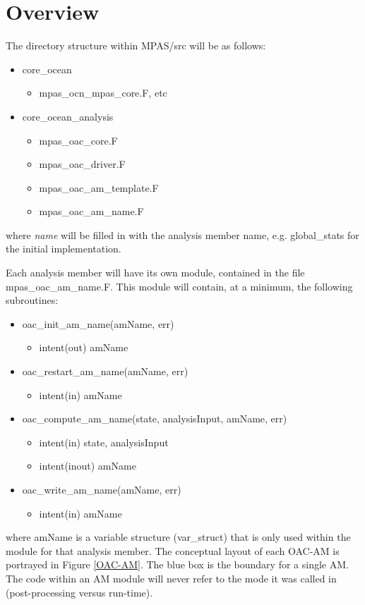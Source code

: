 \documentclass[11pt]{report}
\begin{document}
\section{Overview}

The directory structure within MPAS/src will be as follows:
\begin{itemize}
\item core\_ocean
\begin{itemize}
\item mpas\_ocn\_mpas\_core.F, etc
\end{itemize}
\item core\_ocean\_analysis
\begin{itemize}
\item mpas\_oac\_core.F
\item mpas\_oac\_driver.F
\item mpas\_oac\_am\_template.F
\item mpas\_oac\_am\_name.F
\end{itemize}
\end{itemize}
where {\it name} will be filled in with the analysis member name, e.g. global\_stats for the initial implementation.

Each analysis member will have its own module, contained in the file mpas\_oac\_am\_name.F.  This module will contain, at a minimum, the following subroutines:
\begin{itemize}
\item oac\_init\_am\_name(amName, err)
\begin{itemize}
\item intent(out) amName
\end{itemize}
\item oac\_restart\_am\_name(amName, err)
\begin{itemize}
\item intent(in) amName
\end{itemize}
\item oac\_compute\_am\_name(state, analysisInput, amName, err)
\begin{itemize}
\item intent(in) state, analysisInput
\item intent(inout) amName
\end{itemize}
\item oac\_write\_am\_name(amName, err)
\begin{itemize}
\item intent(in) amName
\end{itemize}
\end{itemize}
where amName is a variable structure (var\_struct) that is only used within the module for that analysis member.  
The conceptual layout of each OAC-AM is portrayed in Figure \ref{OAC-AM}.  The blue box is the boundary for a single AM.  The code within an AM module will never refer to the mode it was called in (post-processing versus run-time).
\end{document}
